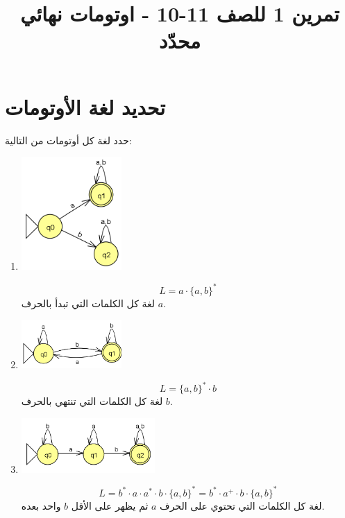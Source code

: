 \documentclass[12pt]{article}
\title{تمرين 1 للصف 11-10 - اوتومات نهائي محدّد}
\begin{document}
\maketitle

\section{تحديد لغة الأوتومات}

حدد لغة كل أوتومات من التالية:

\ifwithsols
\begin{enumerate}[itemsep=3em]
\else
\begin{enumerate}
\fi

\item
\includegraphics[width=0.3\textwidth]{../../../images/DFAs/ex1_q1.png}\\
\ifwithsols
\begin{solution}
\[ L = a \cdot \{a,b\}^* \]
لغة كل الكلمات التي تبدأ بالحرف $a$.
\end{solution}
\fi

\item
\includegraphics[width=0.3\textwidth]{../../../images/DFAs/ex1_q2.png}\\
\ifwithsols
\begin{solution}
    \[ L = \{a,b\}^* \cdot b \]
    لغة كل الكلمات التي تنتهي بالحرف $b$.
\end{solution}
\clearpage
\fi

\item
\includegraphics[width=0.4\textwidth]{../../../images/DFAs/ex1_q3.png}\\
\ifwithsols
\begin{solution}
\[ L = b^* \cdot a \cdot a^* \cdot b \cdot \{a, b \}^* = b^* \cdot a^+ \cdot b \cdot \{a,b\}^* \]
لغة كل الكلمات التي تحتوي على الحرف $a$ ثم يظهر على الأقل $b$ واحد بعده.
\end{solution}
\fi


\end{enumerate}
\end{enumerate}
\end{document}
